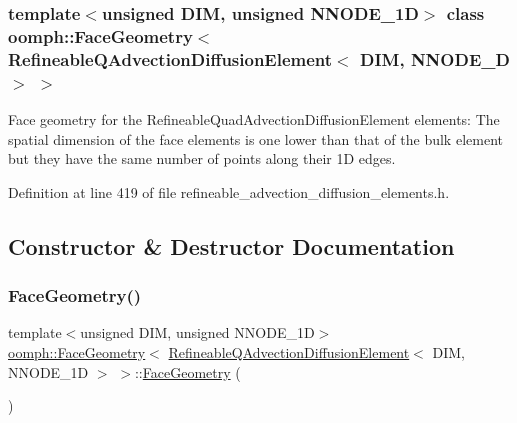 \subsubsection*{template$<$unsigned D\+IM, unsigned N\+N\+O\+D\+E\+\_\+1D$>$\newline
class oomph\+::\+Face\+Geometry$<$ Refineable\+Q\+Advection\+Diffusion\+Element$<$ D\+I\+M, N\+N\+O\+D\+E\+\_\+D $>$ $>$}

Face geometry for the Refineable\+Quad\+Advection\+Diffusion\+Element elements\+: The spatial dimension of the face elements is one lower than that of the bulk element but they have the same number of points along their 1D edges. 

Definition at line 419 of file refineable\+\_\+advection\+\_\+diffusion\+\_\+elements.\+h.



\subsection{Constructor \& Destructor Documentation}
\mbox{\label{classoomph_1_1FaceGeometry_3_01RefineableQAdvectionDiffusionElement_3_01DIM_00_01NNODE__1D_01_4_01_4_ab7265f3b6f11b7778b123876388f5d46}} 
\subsubsection{\texorpdfstring{Face\+Geometry()}{FaceGeometry()}}
{\footnotesize\ttfamily template$<$unsigned D\+IM, unsigned N\+N\+O\+D\+E\+\_\+1D$>$ \\
\hyperlink{classoomph_1_1FaceGeometry}{oomph\+::\+Face\+Geometry}$<$ \hyperlink{classoomph_1_1RefineableQAdvectionDiffusionElement}{Refineable\+Q\+Advection\+Diffusion\+Element}$<$ D\+IM, N\+N\+O\+D\+E\+\_\+1D $>$ $>$\+::\hyperlink{classoomph_1_1FaceGeometry}{Face\+Geometry} (\begin{DoxyParamCaption}{ }\end{DoxyParamCaption})\hspace{0.3cm}{\ttfamily [inline]}}



